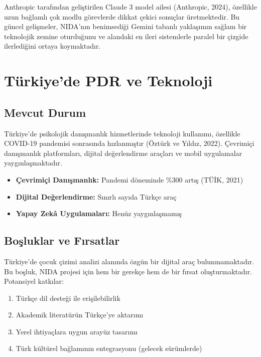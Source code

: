 Anthropic tarafından geliştirilen Claude 3 model ailesi (Anthropic, 2024), özellikle uzun bağlamlı çok modlu görevlerde dikkat çekici sonuçlar üretmektedir. Bu güncel gelişmeler, NIDA'nın benimsediği Gemini tabanlı yaklaşımın sağlam bir teknolojik zemine oturduğunu ve alandaki en ileri sistemlerle paralel bir çizgide ilerlediğini ortaya koymaktadır.

\section{Türkiye'de PDR ve Teknoloji}

\subsection{Mevcut Durum}

Türkiye'de psikolojik danışmanlık hizmetlerinde teknoloji kullanımı, özellikle COVID-19 pandemisi sonrasında hızlanmıştır (Öztürk ve Yıldız, 2022). Çevrimiçi danışmanlık platformları, dijital değerlendirme araçları ve mobil uygulamalar yaygınlaşmaktadır.

\begin{itemize}
  \item \textbf{Çevrimiçi Danışmanlık:} Pandemi döneminde \%300 artış (TÜİK, 2021)
  \item \textbf{Dijital Değerlendirme:} Sınırlı sayıda Türkçe araç
  \item \textbf{Yapay Zekâ Uygulamaları:} Henüz yaygınlaşmamış
\end{itemize}

\subsection{Boşluklar ve Fırsatlar}

Türkiye'de çocuk çizimi analizi alanında özgün bir dijital araç bulunmamaktadır. Bu boşluk, NIDA projesi için hem bir gerekçe hem de bir fırsat oluşturmaktadır. Potansiyel katkılar:

\begin{enumerate}
  \item Türkçe dil desteği ile erişilebilirlik
  \item Akademik literatürün Türkçe'ye aktarımı
  \item Yerel ihtiyaçlara uygun arayüz tasarımı
  \item Türk kültürel bağlamının entegrasyonu (gelecek sürümlerde)
\end{enumerate}

\newpage
